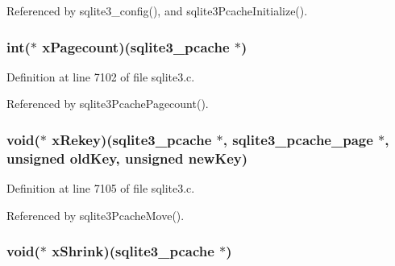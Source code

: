Referenced by sqlite3\+\_\+config(), and sqlite3\+Pcache\+Initialize().

\hypertarget{structsqlite3__pcache__methods2_a2b94d01bdb0e2496c486b48a37a00fea}{}
\subsubsection[{x\+Pagecount}]{\setlength{\rightskip}{0pt plus 5cm}int($\ast$ x\+Pagecount)({\bf sqlite3\+\_\+pcache} $\ast$)}\label{structsqlite3__pcache__methods2_a2b94d01bdb0e2496c486b48a37a00fea}


Definition at line 7102 of file sqlite3.\+c.



Referenced by sqlite3\+Pcache\+Pagecount().

\hypertarget{structsqlite3__pcache__methods2_a34e0336506633df06d0097e3cd1efc3c}{}
\subsubsection[{x\+Rekey}]{\setlength{\rightskip}{0pt plus 5cm}void($\ast$ x\+Rekey)({\bf sqlite3\+\_\+pcache} $\ast$, {\bf sqlite3\+\_\+pcache\+\_\+page} $\ast$, unsigned old\+Key, unsigned new\+Key)}\label{structsqlite3__pcache__methods2_a34e0336506633df06d0097e3cd1efc3c}


Definition at line 7105 of file sqlite3.\+c.



Referenced by sqlite3\+Pcache\+Move().

\hypertarget{structsqlite3__pcache__methods2_ac4b52039f04b209c29fe57cff1a6cf08}{}
\subsubsection[{x\+Shrink}]{\setlength{\rightskip}{0pt plus 5cm}void($\ast$ x\+Shrink)({\bf sqlite3\+\_\+pcache} $\ast$)}\label{structsqlite3__pcache__methods2_ac4b52039f04b209c29fe57cff1a6cf08}


